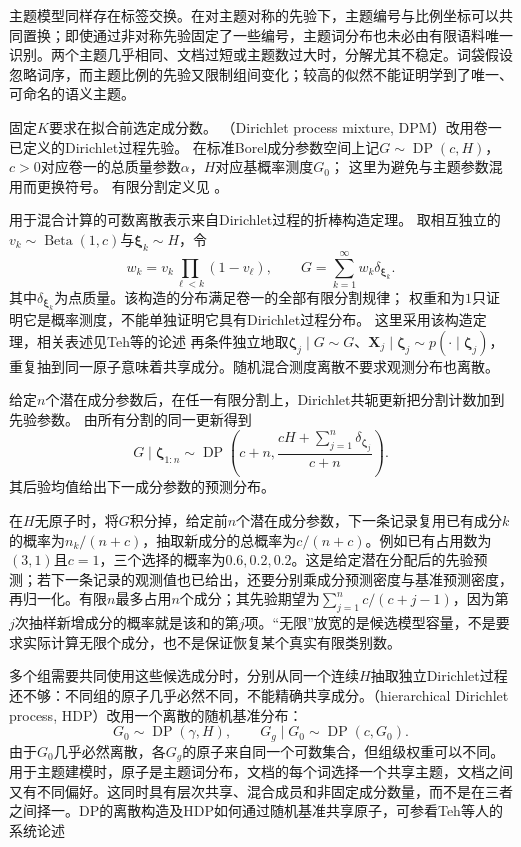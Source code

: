 主题模型同样存在标签交换。在对主题对称的先验下，主题编号与比例坐标可以共同置换；即使通过非对称先验固定了一些编号，主题词分布也未必由有限语料唯一识别。两个主题几乎相同、文档过短或主题数过大时，分解尤其不稳定。词袋假设忽略词序，而主题比例的先验又限制组间变化；较高的似然不能证明学到了唯一、可命名的语义主题。

固定$K$要求在拟合前选定成分数。
（Dirichlet process mixture, DPM）改用卷一已定义的Dirichlet过程先验。
在标准Borel成分参数空间上记$G\sim\operatorname{DP}(c,H)$，
$c>0$对应卷一的总质量参数$\alpha$，$H$对应基概率测度$G_0$；
这里为避免与主题参数混用而更换符号。
有限分割定义见
。

用于混合计算的可数离散表示来自Dirichlet过程的折棒构造定理。
取相互独立的$v_k\sim\operatorname{Beta}(1,c)$与$\bm{\xi}_k\sim H$，令
\[
  w_k=v_k\prod_{\ell<k}(1-v_\ell),\qquad
  G=\sum_{k=1}^{\infty}w_k\delta_{\bm{\xi}_k}.
\]
其中$\delta_{\bm{\xi}_k}$为点质量。该构造的分布满足卷一的全部有限分割规律；
权重和为$1$只证明它是概率测度，不能单独证明它具有Dirichlet过程分布。
这里采用该构造定理，相关表述见Teh等的论述
再条件独立地取$\bm\zeta_j\mid G\sim G$、$\bm X_j\mid\bm\zeta_j\sim p(\cdot\mid\bm\zeta_j)$，
重复抽到同一原子意味着共享成分。随机混合测度离散不要求观测分布也离散。

给定$n$个潜在成分参数后，在任一有限分割上，Dirichlet共轭更新把分割计数加到先验参数。
由所有分割的同一更新得到
\[
  G\mid\bm\zeta_{1:n}\sim\operatorname{DP}
    \left(c+n,\frac{cH+\sum_{j=1}^n\delta_{\bm\zeta_j}}{c+n}\right).
\]
其后验均值给出下一成分参数的预测分布。

在$H$无原子时，将$G$积分掉，给定前$n$个潜在成分参数，下一条记录复用已有成分$k$的概率为$n_k/(n+c)$，抽取新成分的总概率为$c/(n+c)$。例如已有占用数为$(3,1)$且$c=1$，三个选择的概率为$0.6,0.2,0.2$。这是给定潜在分配后的先验预测；若下一条记录的观测值也已给出，还要分别乘成分预测密度与基准预测密度，再归一化。有限$n$最多占用$n$个成分；其先验期望为$\sum_{j=1}^{n}c/(c+j-1)$，因为第$j$次抽样新增成分的概率就是该和的第$j$项。“无限”放宽的是候选模型容量，不是要求实际计算无限个成分，也不是保证恢复某个真实有限类别数。

多个组需要共同使用这些候选成分时，分别从同一个连续$H$抽取独立Dirichlet过程还不够：不同组的原子几乎必然不同，不能精确共享成分。（hierarchical Dirichlet process, HDP）改用一个离散的随机基准分布：
\begin{equation}
  \label{eq:pgm-static-directed-hdp}
  G_0\sim\operatorname{DP}(\gamma,H),\qquad
  G_g\mid G_0\sim\operatorname{DP}(c,G_0).
\end{equation}
由于$G_0$几乎必然离散，各$G_g$的原子来自同一个可数集合，但组级权重可以不同。用于主题建模时，原子是主题词分布，文档的每个词选择一个共享主题，文档之间又有不同偏好。这同时具有层次共享、混合成员和非固定成分数量，而不是在三者之间择一。DP的离散构造及HDP如何通过随机基准共享原子，可参看Teh等人的系统论述

